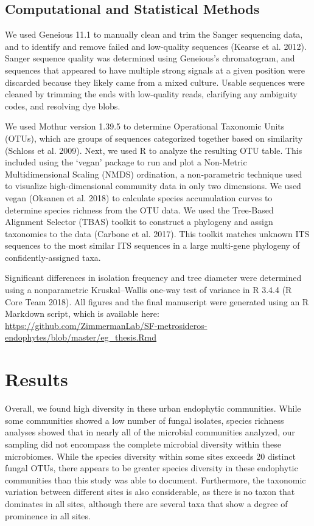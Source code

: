 \documentclass[fleqn,10pt,lineno]{wlpeerj} %
\begin{document}
\hypertarget{computational-and-statistical-methods}{%
\subsection{Computational and Statistical
Methods}\label{computational-and-statistical-methods}}

We used Geneious 11.1 to manually clean and trim the Sanger sequencing
data, and to identify and remove failed and low-quality sequences
(Kearse et al. 2012). Sanger sequence quality was determined using
Geneious's chromatogram, and sequences that appeared to have multiple
strong signals at a given position were discarded because they likely
came from a mixed culture. Usable sequences were cleaned by trimming the
ends with low-quality reads, clarifying any ambiguity codes, and
resolving dye blobs.

We used Mothur version 1.39.5 to determine Operational Taxonomic Units
(OTUs), which are groups of sequences categorized together based on
similarity (Schloss et al. 2009). Next, we used R to analyze the
resulting OTU table. This included using the `vegan' package to run and
plot a Non-Metric Multidimensional Scaling (NMDS) ordination, a
non-parametric technique used to visualize high-dimensional community
data in only two dimensions. We used vegan (Oksanen et al. 2018) to
calculate species accumulation curves to determine species richness from
the OTU data. We used the Tree-Based Alignment Selector (TBAS) toolkit
to construct a phylogeny and assign taxonomies to the data (Carbone et
al. 2017). This toolkit matches unknown ITS sequences to the most
similar ITS sequences in a large multi-gene phylogeny of
confidently-assigned taxa.

Significant differences in isolation frequency and tree diameter were
determined using a nonparametric Kruskal--Wallis one-way test of
variance in R 3.4.4 (R Core Team 2018). All figures and the final
manuscript were generated using an R Markdown script, which is available
here:
\url{https://github.com/ZimmermanLab/SF-metrosideros-endophytes/blob/master/eg_thesis.Rmd}

\hypertarget{results}{%
\section{Results}\label{results}}

Overall, we found high diversity in these urban endophytic communities.
While some communities showed a low number of fungal isolates, species
richness analyses showed that in nearly all of the microbial communities
analyzed, our sampling did not encompass the complete microbial
diversity within these microbiomes. While the species diversity within
some sites exceeds 20 distinct fungal OTUs, there appears to be greater
species diversity in these endophytic communities than this study was
able to document. Furthermore, the taxonomic variation between different
sites is also considerable, as there is no taxon that dominates in all
sites, although there are several taxa that show a degree of prominence
in all sites.
\end{document}
